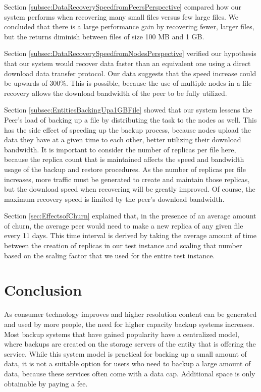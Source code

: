 \documentclass[12pt]{report}
\begin{document}
Section \ref{subsec:DataRecoverySpeedfromPeersPerspective} compared how our system performs when recovering many small files versus few large files. We concluded that there is a large performance gain by recovering fewer, larger files, but the returns diminish between files of size 100 MB and 1 GB.

Section \ref{subsec:DataRecoverySpeedfromNodesPerspective} verified our hypothesis that our system would recover data faster than an equivalent one using a direct download data transfer protocol. Our data suggests that the speed increase could be upwards of 300\%. This is possible, because the use of multiple nodes in a file recovery allows the download bandwidth of the peer to be fully utilized.

Section \ref{subsec:EntitiesBackingUpa1GBFile} showed that our system lessens the Peer's load of backing up a file by distributing the task to the nodes as well. This has the side effect of speeding up the backup process, because nodes upload the data they have at a given time to each other, better utilizing their download bandwidth. It is important to consider the number of replicas per file here, because the replica count that is maintained affects the speed and bandwidth usage of the backup and restore procedures. As the number of replicas per file increases, more traffic must be generated to create and maintain those replicas, but the download speed when recovering will be greatly improved. Of course, the maximum recovery speed is limited by the peer's download bandwidth.

Section \ref{sec:EffectsofChurn} explained that, in the presence of an average amount of churn, the average peer would need to make a new replica of any given file every 11 days. This time interval is derived by taking the average amount of time between the creation of replicas in our test instance and scaling that number based on the scaling factor that we used for the entire test instance.

\chapter{Conclusion} \label{chap:Conclusion}

As consumer technology improves and higher resolution content can be generated and used by more people, the need for higher capacity backup systems increases. Most backup systems that have gained popularity have a centralized model, where backups are created on the storage servers of the entity that is offering the service. While this system model is practical for backing up a small amount of data, it is not a suitable option for users who need to backup a large amount of data, because these services often come with a data cap. Additional space is only obtainable by paying a fee.
\end{document}
